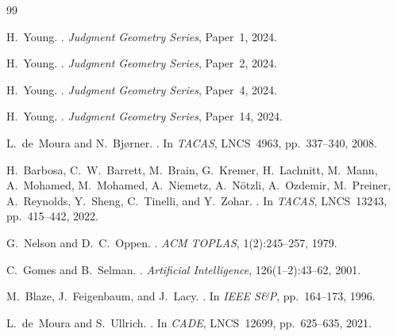 \documentclass[11pt]{article}
\begin{document}
\begin{thebibliography}{99}

H.~Young.
.
\newblock \textit{Judgment Geometry Series}, Paper~1, 2024.

H.~Young.
.
\newblock \textit{Judgment Geometry Series}, Paper~2, 2024.

H.~Young.
.
\newblock \textit{Judgment Geometry Series}, Paper~4, 2024.

H.~Young.
.
\newblock \textit{Judgment Geometry Series}, Paper~14, 2024.

L.~de~Moura and N.~Bj{\o}rner.
.
\newblock In \textit{TACAS}, LNCS~4963, pp.~337--340, 2008.

H.~Barbosa, C.~W.~Barrett, M.~Brain, G.~Kremer, H.~Lachnitt,
  M.~Mann, A.~Mohamed, M.~Mohamed, A.~Niemetz, A.~N{\"o}tzli,
  A.~Ozdemir, M.~Preiner, A.~Reynolds, Y.~Sheng, C.~Tinelli, and
  Y.~Zohar.
.
\newblock In \textit{TACAS}, LNCS~13243, pp.~415--442, 2022.

G.~Nelson and D.~C.~Oppen.
.
\newblock \textit{ACM TOPLAS}, 1(2):245--257, 1979.

C.~Gomes and B.~Selman.
.
\newblock \textit{Artificial Intelligence}, 126(1--2):43--62, 2001.

M.~Blaze, J.~Feigenbaum, and J.~Lacy.
.
\newblock In \textit{IEEE S\&P}, pp.~164--173, 1996.

L.~de~Moura and S.~Ullrich.
.
\newblock In \textit{CADE}, LNCS~12699, pp.~625--635, 2021.

\end{thebibliography}
\end{document}
